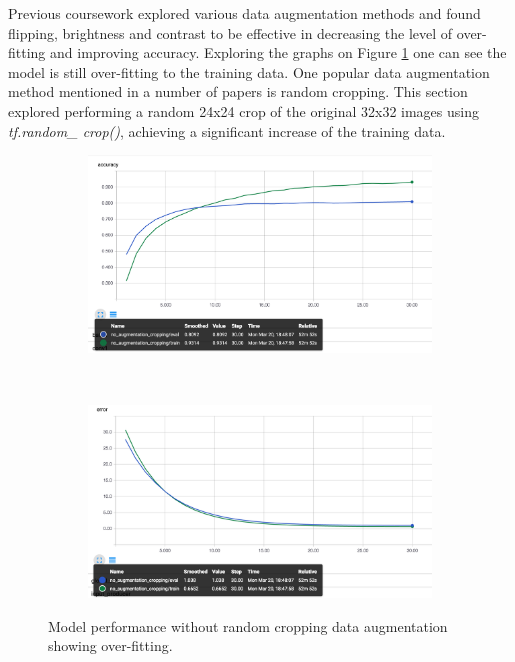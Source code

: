 \documentclass[12pt]{article}
\begin{document}
Previous coursework\cite{me} explored various data augmentation methods and found flipping, brightness and contrast to be effective in decreasing the level of over-fitting and improving accuracy. Exploring the graphs on Figure \ref{fig:noaug} one can see the model is still over-fitting to the training data. One popular data augmentation method mentioned in a number of papers \cite{kernel}\cite{crop} is random cropping. This section explored performing a random 24x24 crop of the original 32x32 images using \textit{tf.random\_ crop()}, achieving a significant increase of the training data.

\begin{figure}[ht!]
    \centering
    \begin{subfigure}[t]{0.475\textwidth}
        \centering
        \includegraphics[width=1.0\linewidth]{noauga.png}
    \end{subfigure}%
    ~ 
    \begin{subfigure}[t]{0.475\textwidth}
        \centering
        \includegraphics[width=1.0\linewidth]{noaugt.png}
    \end{subfigure}
    \caption{Model performance without random cropping data augmentation showing over-fitting. }
    \label{fig:noaug}
\end{figure}
\end{document}
